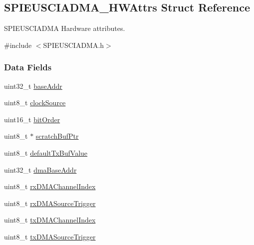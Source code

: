 \subsection{S\-P\-I\-E\-U\-S\-C\-I\-A\-D\-M\-A\-\_\-\-H\-W\-Attrs Struct Reference}
\label{struct_s_p_i_e_u_s_c_i_a_d_m_a___h_w_attrs}


S\-P\-I\-E\-U\-S\-C\-I\-A\-D\-M\-A Hardware attributes.  




{\ttfamily \#include $<$S\-P\-I\-E\-U\-S\-C\-I\-A\-D\-M\-A.\-h$>$}

\subsubsection*{Data Fields}
\begin{DoxyCompactItemize}
\item 
uint32\-\_\-t \hyperlink{struct_s_p_i_e_u_s_c_i_a_d_m_a___h_w_attrs_a2d0c61d4d3b6d0bc7be6c8099777218b}{base\-Addr}
\item 
uint8\-\_\-t \hyperlink{struct_s_p_i_e_u_s_c_i_a_d_m_a___h_w_attrs_a55287dc23a355a59426281488f93751c}{clock\-Source}
\item 
uint16\-\_\-t \hyperlink{struct_s_p_i_e_u_s_c_i_a_d_m_a___h_w_attrs_a334de16b0d88008d2a2861c7fbfd12c9}{bit\-Order}
\item 
uint8\-\_\-t $\ast$ \hyperlink{struct_s_p_i_e_u_s_c_i_a_d_m_a___h_w_attrs_a7dbf1b486afe617017a67f00deb66c7f}{scratch\-Buf\-Ptr}
\item 
uint8\-\_\-t \hyperlink{struct_s_p_i_e_u_s_c_i_a_d_m_a___h_w_attrs_af8f32ede102305173f56ad61394af36b}{default\-Tx\-Buf\-Value}
\item 
uint32\-\_\-t \hyperlink{struct_s_p_i_e_u_s_c_i_a_d_m_a___h_w_attrs_a6a3751b0693770600e990c1db9980da4}{dma\-Base\-Addr}
\item 
uint8\-\_\-t \hyperlink{struct_s_p_i_e_u_s_c_i_a_d_m_a___h_w_attrs_a7d9c5ce7284e01f13535ffb1aaacd039}{rx\-D\-M\-A\-Channel\-Index}
\item 
uint8\-\_\-t \hyperlink{struct_s_p_i_e_u_s_c_i_a_d_m_a___h_w_attrs_ac6ae7a900452d8f24381f26e2b8a2e1b}{rx\-D\-M\-A\-Source\-Trigger}
\item 
uint8\-\_\-t \hyperlink{struct_s_p_i_e_u_s_c_i_a_d_m_a___h_w_attrs_ae0154552cc397e1b4d99a490bc9676e1}{tx\-D\-M\-A\-Channel\-Index}
\item 
uint8\-\_\-t \hyperlink{struct_s_p_i_e_u_s_c_i_a_d_m_a___h_w_attrs_a381d4d773f4c309e35eec9da42305037}{tx\-D\-M\-A\-Source\-Trigger}
\end{DoxyCompactItemize}


